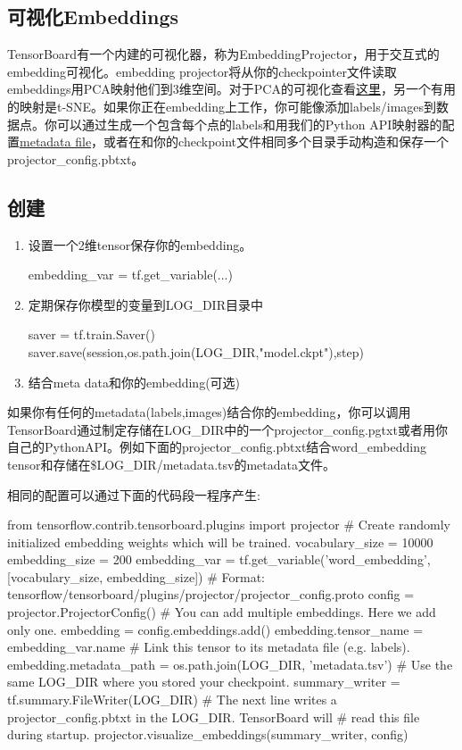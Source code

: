 \subsection{可视化Embeddings}
TensorBoard有一个内建的可视化器，称为EmbeddingProjector，用于交互式的embedding可视化。embedding projector将从你的checkpointer文件读取embeddings用PCA映射他们到3维空间。对于PCA的可视化查看\href{http://setosa.io/ev/principal-component-analysis/}{这里}，另一个有用的映射是t-SNE。如果你正在embedding上工作，你可能像添加labels/images到数据点。你可以通过生成一个包含每个点的labels和用我们的Python API映射器的配置\href{https://www.tensorflow.org/programmers_guide/embedding#metadata}{metadata file}，或者在和你的checkpoint文件相同多个目录手动构造和保存一个projector\_config.pbtxt。
\subsection{创建}
\begin{enumerate}
	\item 设置一个2维tensor保存你的embedding。
		\begin{python}
			embedding\_var = tf.get\_variable(...)
		\end{python}
	\item 定期保存你模型的变量到LOG\_DIR目录中
		\begin{python}
			saver = tf.train.Saver()
			saver.save(session,os.path.join(LOG_DIR,"model.ckpt"),step)
		\end{python}
	\item 结合meta data和你的embedding(可选)
\end{enumerate}
如果你有任何的metadata(labels,images)结合你的embedding，你可以调用TensorBoard通过制定存储在LOG\_DIR中的一个projector\_config.pgtxt或者用你自己的PythonAPI。例如下面的projector\_config.pbtxt结合word\_embedding tensor和存储在\$LOG\_DIR/metadata.tsv的metadata文件。
相同的配置可以通过下面的代码段一程序产生:
\begin{python}
from tensorflow.contrib.tensorboard.plugins import projector
# Create randomly initialized embedding weights which will be trained.
vocabulary_size = 10000
embedding_size = 200
embedding_var = tf.get_variable('word_embedding', [vocabulary_size, embedding_size])
# Format: tensorflow/tensorboard/plugins/projector/projector_config.proto
config = projector.ProjectorConfig()
# You can add multiple embeddings. Here we add only one.
embedding = config.embeddings.add()
embedding.tensor_name = embedding_var.name
# Link this tensor to its metadata file (e.g. labels).
embedding.metadata_path = os.path.join(LOG_DIR, 'metadata.tsv')
# Use the same LOG_DIR where you stored your checkpoint.
summary_writer = tf.summary.FileWriter(LOG_DIR)
# The next line writes a projector_config.pbtxt in the LOG_DIR. TensorBoard will
# read this file during startup.
projector.visualize_embeddings(summary_writer, config)
\end{python}
